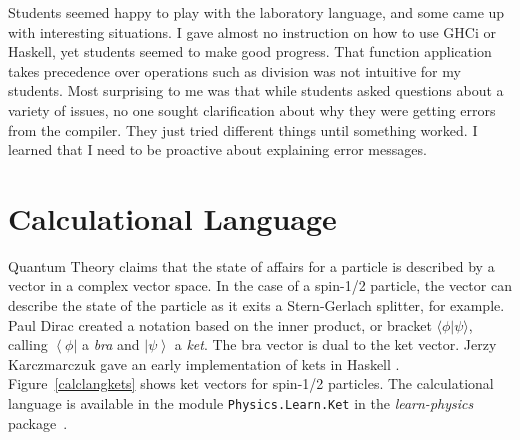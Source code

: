 \documentclass[12pt]{article}
\newcommand{\ket}[1]{\left| #1 \right\rangle}
\newcommand{\bra}[1]{\left\langle #1 \right|}
\begin{document}
Students seemed happy to play with the laboratory language,
and some came up with interesting situations.
I gave almost no instruction on how to use GHCi or Haskell,
yet students seemed to make good progress.
That function application takes precedence over
operations such as division was not intuitive for my students.
Most surprising to me was that while students asked questions
about a variety of issues, no one sought clarification about
why they were getting errors from the compiler.
They just tried different things until something worked.
I learned that I need to be proactive about explaining
error messages.

\section{Calculational Language}
\label{calclang}

Quantum Theory claims that the state of affairs for
a particle is described by a vector in a complex vector space.
In the case of a spin-1/2
particle, the vector can describe the state of the particle as it exits
a Stern-Gerlach splitter, for example.  Paul Dirac created a notation
based on the inner product, or bracket $\langle \phi | \psi \rangle$,
calling $\bra{\phi}$ a \emph{bra} and $\ket{\psi}$ a \emph{ket}.  The bra vector
is dual to the ket vector.  Jerzy Karczmarczuk gave an early
implementation of kets in Haskell \cite{karczmarczuk2003}.
Figure~\ref{calclangkets} shows ket
vectors for spin-1/2 particles.
The calculational language
is available in the module \texttt{Physics.Learn.Ket} in the \emph{learn-physics}
package~\cite{learn-physics}.
\end{document}
